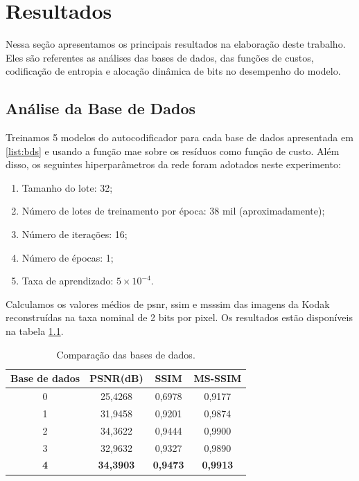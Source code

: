 
\chapter{Resultados}
Nessa seção apresentamos os principais resultados na elaboração deste trabalho. Eles são referentes as análises das bases de dados, das funções de custos, codificação de entropia e alocação dinâmica de bits no desempenho do modelo. 


\section{Análise da Base de Dados}

Treinamos 5 modelos do autocodificador para cada base de dados apresentada em \ref{list:bds} e usando a função \acrshort{mae} sobre os resíduos como função de custo. Além disso, os seguintes hiperparâmetros da rede foram adotados neste experimento: 

\begin{enumerate}
	\label{enum:hiper_param}
	\item Tamanho do lote: 32; 
	\item Número de lotes de treinamento por época: 38 mil (aproximadamente);   
	\item Número de iterações: 16;
	\item Número de épocas: 1;
	\item Taxa de aprendizado: $5 \times {10}^{-4}$.
\end{enumerate}

Calculamos os valores médios de \acrshort{psnr}, \acrshort{ssim} e \acrshort{msssim} das imagens da Kodak reconstruídas na taxa nominal de 2 bits por pixel. Os resultados estão disponíveis na tabela \ref{table:comp_datasets}.


\begin{table}[htbp]
	\centering
	\caption[Comparação das bases de dados]{Comparação das bases de dados.}
	\begin{tabular}{|c|c|c|c|}
		\hline
		\textbf{Base de dados} & \textbf{PSNR(dB)}    & \textbf{SSIM}   & \textbf{MS-SSIM}\\\hline
		0            & 25,4268          & 0,6978          & 0,9177           \\\hline
		1            & 31,9458          & 0,9201          & 0,9874           \\\hline
		2            & 34,3622          & 0,9444          & 0,9900           \\\hline
		3            & 32,9632	       & 0,9327          & 0,9890           \\\hline
		\textbf{4}            & \textbf{34,3903} & \textbf{0,9473} & \textbf{0,9913}     
		\\ \hline
	\end{tabular}
	\label{table:comp_datasets}
\end{table}

